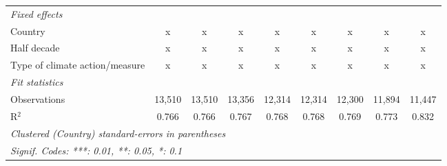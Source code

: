 \begin{table}[htbp]
\begin{tabular}{lcccccccc}
      \emph{Fixed effects}\\
      Country                                                               & x       & x       & x           & x             & x             & x             & x             & x\\  
      Half decade                                                           & x       & x       & x           & x             & x             & x             & x             & x\\  
      Type of climate action/measure                                        & x       & x       & x           & x             & x             & x             & x             & x\\  
      \midrule \emph{Fit statistics}\\
      Observations                                                          & 13,510  & 13,510  & 13,356      & 12,314        & 12,314        & 12,300        & 11,894        & 11,447\\  
      R$^2$                                                                 & 0.766   & 0.766   & 0.767       & 0.768         & 0.768         & 0.769         & 0.773         & 0.832\\  
      \midrule
      \multicolumn{9}{l}{\emph{Clustered (Country) standard-errors in parentheses}}\\
      \multicolumn{9}{l}{\emph{Signif. Codes: ***: 0.01, **: 0.05, *: 0.1}}\\
   \end{tabular}
\end{table}


